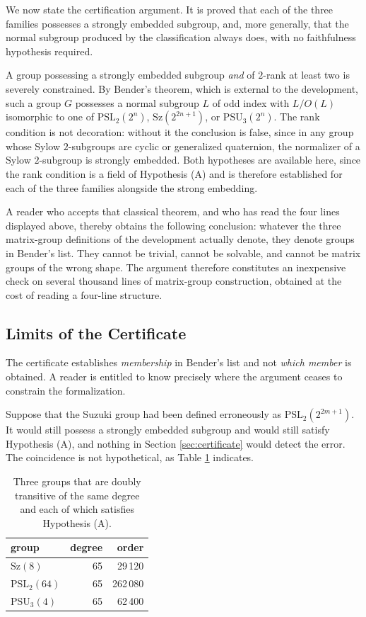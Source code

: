 \documentclass{article}
\begin{document}
We now state the certification argument. It is proved that each of the three
families possesses a strongly embedded subgroup, and, more generally, that the
normal subgroup produced by the classification always does, with no faithfulness
hypothesis required.

A group possessing a strongly embedded subgroup \emph{and} of \(2\)-rank at
least two is severely constrained. By Bender's theorem, which is external to the
development, such a group \(G\) possesses a normal subgroup \(L\) of odd index
with \(L/O(L)\) isomorphic to one of \(\mathrm{PSL}_2(2^n)\),
\(\mathrm{Sz}(2^{2n+1})\), or \(\mathrm{PSU}_3(2^n)\). The rank condition is not
decoration: without it the conclusion is false, since in any group whose Sylow
\(2\)-subgroups are cyclic or generalized quaternion, the normalizer of a Sylow
\(2\)-subgroup is strongly embedded. Both hypotheses are available here, since
the rank condition is a field of Hypothesis (A) and is therefore established for
each of the three families alongside the strong embedding.

A reader who accepts that classical theorem, and who has read the four lines
displayed above, thereby obtains the following conclusion: whatever the three
matrix-group definitions of the development actually denote, they denote groups
in Bender's list. They cannot be trivial, cannot be solvable, and cannot be
matrix groups of the wrong shape. The argument therefore constitutes an
inexpensive check on several thousand lines of matrix-group construction,
obtained at the cost of reading a four-line structure.

\subsection{Limits of the Certificate}
\label{sec:limits}

The certificate establishes \emph{membership} in Bender's list and not
\emph{which member} is obtained. A reader is entitled to know precisely where
the argument ceases to constrain the formalization.

Suppose that the Suzuki group had been defined erroneously as
\(\mathrm{PSL}_2(2^{2m+1})\). It would still possess a strongly embedded
subgroup and would still satisfy Hypothesis (A), and nothing in Section
\ref{sec:certificate} would detect the error. The coincidence is not
hypothetical, as Table \ref{tab:degree65} indicates.

\begin{table}[t]
\centering
\begin{tabular}{lrr}
\toprule
group & degree & order \\
\midrule
\(\mathrm{Sz}(8)\)        & 65 & 29\,120 \\
\(\mathrm{PSL}_2(64)\)    & 65 & 262\,080 \\
\(\mathrm{PSU}_3(4)\)     & 65 & 62\,400 \\
\bottomrule
\end{tabular}
\caption{Three groups that are doubly transitive of the same degree and each of
which satisfies Hypothesis (A).}
\label{tab:degree65}
\end{table}
\end{document}
